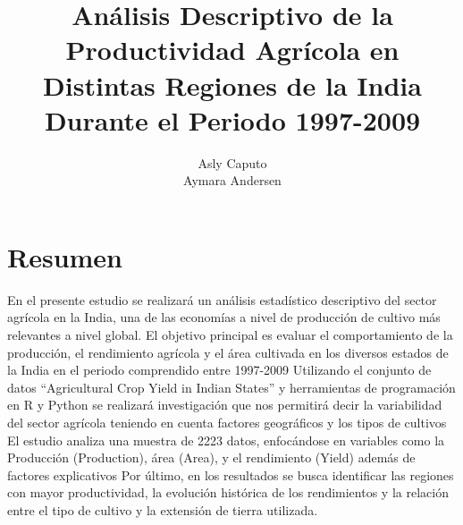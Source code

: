 \documentclass[oneside,11pt]{Latex/Classes/PhDthesisPSnPDF}
\title{Análisis Descriptivo de la Productividad Agrícola en Distintas
Regiones de la India Durante el Periodo 1997-2009}
\author{Asly Caputo \\ Aymara Andersen}
\begin{document}
\maketitle

\frontmatter


\setcounter{secnumdepth}{3}
\setcounter{tocdepth}{3}

\tableofcontents



\cleardoublepage

  \cleardoublepage       %
  \chapter*{Resumen}     %
  
  En el presente estudio se realizará un análisis estadístico
descriptivo del sector agrícola en la India, una de las economías a
nivel de producción de cultivo más relevantes a nivel global. El
objetivo principal es evaluar el comportamiento de la producción, el
rendimiento agrícola y el área cultivada en los diversos estados de la
India en el periodo comprendido entre 1997-2009 Utilizando el conjunto
de datos ``Agricultural Crop Yield in Indian States'' y herramientas de
programación en R y Python se realizará investigación que nos permitirá
decir la variabilidad del sector agrícola teniendo en cuenta factores
geográficos y los tipos de cultivos El estudio analiza una muestra de
2223 datos, enfocándose en variables como la Producción (Production),
área (Area), y el rendimiento (Yield) además de factores explicativos
Por último, en los resultados se busca identificar las regiones con
mayor productividad, la evolución histórica de los rendimientos y la
relación entre el tipo de cultivo y la extensión de tierra
utilizada.             %
  
  \cleardoublepage

\mainmatter
\def\baselinestretch{1.5}
\end{document}

